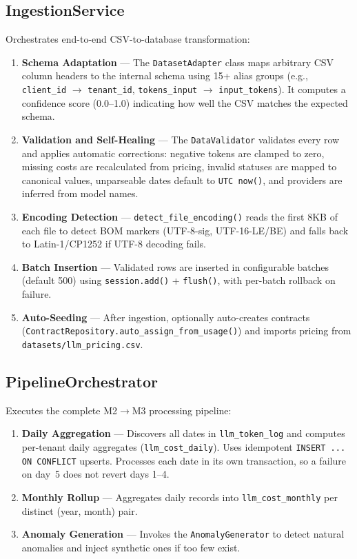 \documentclass[12pt,a4paper,twoside]{report}
\begin{document}
\subsection{IngestionService}

Orchestrates end-to-end CSV-to-database transformation:
\begin{enumerate}
  \item \textbf{Schema Adaptation} --- The \texttt{DatasetAdapter} class maps arbitrary CSV column headers to the internal schema using 15+ alias groups (e.g., \texttt{client\_id} $\rightarrow$ \texttt{tenant\_id}, \texttt{tokens\_input} $\rightarrow$ \texttt{input\_tokens}). It computes a confidence score (0.0--1.0) indicating how well the CSV matches the expected schema.
  \item \textbf{Validation and Self-Healing} --- The \texttt{DataValidator} validates every row and applies automatic corrections: negative tokens are clamped to zero, missing costs are recalculated from pricing, invalid statuses are mapped to canonical values, unparseable dates default to \texttt{UTC now()}, and providers are inferred from model names.
  \item \textbf{Encoding Detection} --- \texttt{detect\_file\_encoding()} reads the first 8KB of each file to detect BOM markers (UTF-8-sig, UTF-16-LE/BE) and falls back to Latin-1/CP1252 if UTF-8 decoding fails.
  \item \textbf{Batch Insertion} --- Validated rows are inserted in configurable batches (default 500) using \texttt{session.add()} + \texttt{flush()}, with per-batch rollback on failure.
  \item \textbf{Auto-Seeding} --- After ingestion, optionally auto-creates contracts (\texttt{ContractRepository.auto\_assign\_from\_usage()}) and imports pricing from \texttt{datasets/llm\_pricing.csv}.
\end{enumerate}

\subsection{PipelineOrchestrator}

Executes the complete M2$\rightarrow$M3 processing pipeline:
\begin{enumerate}
  \item \textbf{Daily Aggregation} --- Discovers all dates in \texttt{llm\_token\_log} and computes per-tenant daily aggregates (\texttt{llm\_cost\_daily}). Uses idempotent \texttt{INSERT ... ON CONFLICT} upserts. Processes each date in its own transaction, so a failure on day~5 does not revert days 1--4.
  \item \textbf{Monthly Rollup} --- Aggregates daily records into \texttt{llm\_cost\_monthly} per distinct (year, month) pair.
  \item \textbf{Anomaly Generation} --- Invokes the \texttt{AnomalyGenerator} to detect natural anomalies and inject synthetic ones if too few exist.
\end{enumerate}
\end{document}
